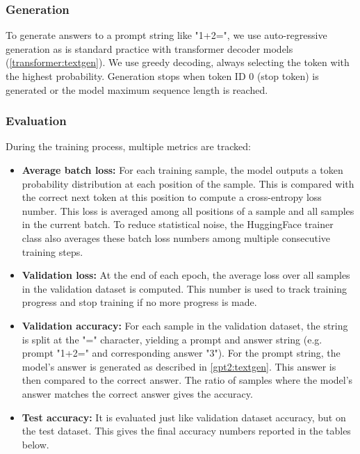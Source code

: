 \subsubsection{Generation}
\label{setup:generation}

To generate answers to a prompt string like "1+2=", we use auto-regressive generation as is standard practice with transformer decoder models (\cref{transformer:textgen}). We use greedy decoding, always selecting the token with the highest probability. Generation stops when token ID 0 (stop token) is generated or the model maximum sequence length is reached.


\subsubsection{Evaluation}
\label{setup:eval}

During the training process, multiple metrics are tracked:

\begin{itemize}
	\item \textbf{Average batch loss:}
	For each training sample, the model outputs a token probability distribution at each position of the sample. This is compared with the correct next token at this position to compute a cross-entropy loss number. This loss is averaged among all positions of a sample and all samples in the current batch. To reduce statistical noise, the HuggingFace trainer class also averages these batch loss numbers among multiple consecutive training steps.
	
	\item \textbf{Validation loss:}
	At the end of each epoch, the average loss over all samples in the validation dataset is computed. This number is used to track training progress and stop training if no more progress is made.
	
	\item \textbf{Validation accuracy:}
	For each sample in the validation dataset, the string is split at the "=" character, yielding a prompt and answer string (e.g. prompt "1+2=" and corresponding answer "3"). For the prompt string, the model's answer is generated as described in \cref{gpt2:textgen}. This answer is then compared to the correct answer. The ratio of samples where the model's answer matches the correct answer gives the accuracy.
	
	\item \textbf{Test accuracy:}
	It is evaluated just like validation dataset accuracy, but on the test dataset. This gives the final accuracy numbers reported in the tables below.
\end{itemize}



